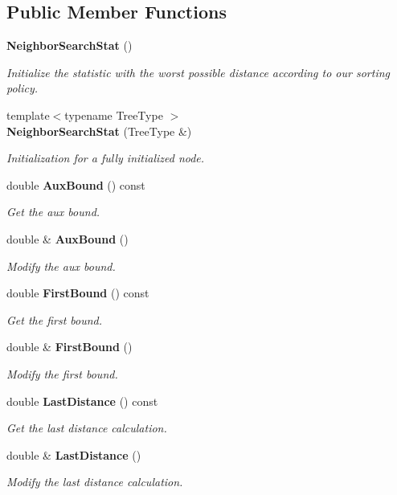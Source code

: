 \subsection*{Public Member Functions}
\begin{DoxyCompactItemize}
\item 
{\bf Neighbor\+Search\+Stat} ()
\begin{DoxyCompactList}\small\item\em Initialize the statistic with the worst possible distance according to our sorting policy. \end{DoxyCompactList}\item 
{\footnotesize template$<$typename Tree\+Type $>$ }\\{\bf Neighbor\+Search\+Stat} (Tree\+Type \&)
\begin{DoxyCompactList}\small\item\em Initialization for a fully initialized node. \end{DoxyCompactList}\item 
double {\bf Aux\+Bound} () const 
\begin{DoxyCompactList}\small\item\em Get the aux bound. \end{DoxyCompactList}\item 
double \& {\bf Aux\+Bound} ()
\begin{DoxyCompactList}\small\item\em Modify the aux bound. \end{DoxyCompactList}\item 
double {\bf First\+Bound} () const 
\begin{DoxyCompactList}\small\item\em Get the first bound. \end{DoxyCompactList}\item 
double \& {\bf First\+Bound} ()
\begin{DoxyCompactList}\small\item\em Modify the first bound. \end{DoxyCompactList}\item 
double {\bf Last\+Distance} () const 
\begin{DoxyCompactList}\small\item\em Get the last distance calculation. \end{DoxyCompactList}\item 
double \& {\bf Last\+Distance} ()
\begin{DoxyCompactList}\small\item\em Modify the last distance calculation. \end{DoxyCompactList}\item 

\end{DoxyCompactItemize}
